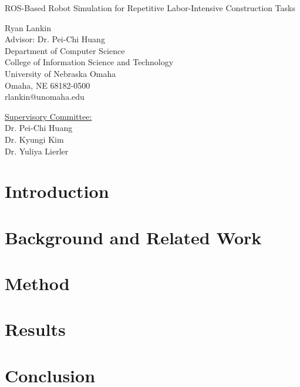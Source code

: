\documentclass[12pt]{report}
\begin{document}
    \begin{titlepage}
        \centering

        {\Large ROS-Based Robot Simulation for Repetitive Labor-Intensive Construction Tasks}

        \vspace{10mm}

        Ryan Lankin\\
        Advisor: Dr. Pei-Chi Huang\\
        Department of Computer Science\\
        College of Information Science and Technology\\
        University of Nebraska Omaha\\
        Omaha, NE 68182-0500\\
        rlankin@unomaha.edu

        \vspace{10mm}

        \underline{Supervisory Committee:}\\
        Dr. Pei-Chi Huang\\
        Dr. Kyungi Kim\\
        Dr. Yuliya Lierler\\
    \end{titlepage}

    \begin{abstract}
    \end{abstract}


    \tableofcontents{}

    \chapter{Introduction} \label{ch:introduction}

    \chapter{Background and Related Work} \label{ch:relatedwork}

    \chapter{Method} \label{ch:method}

    \chapter{Results} \label{ch:results}

    \chapter{Conclusion} \label{ch:conclusion}

    \printbibliography
\end{document}
